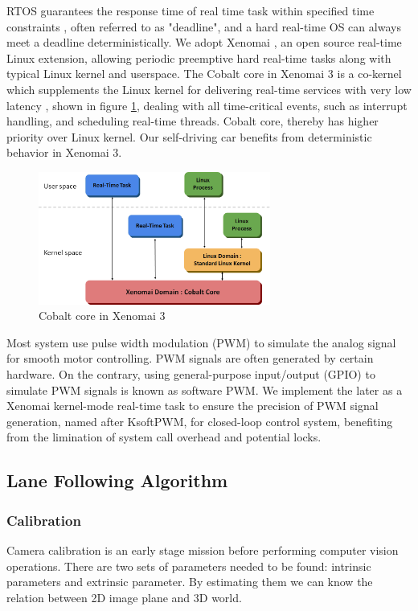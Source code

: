 \documentclass[conference]{IEEEtran}
\begin{document}
RTOS guarantees the response time of real time task within specified time constraints \cite{RTOS}, often referred to as "deadline", and a hard real-time OS can always meet a deadline deterministically. We adopt Xenomai \cite{Xenomai}, an open source real-time Linux extension, allowing periodic preemptive hard real-time tasks along with typical Linux kernel and userspace. The Cobalt core in Xenomai 3 is a co-kernel which supplements the Linux kernel for delivering real-time services with very low latency \cite{rtlws2015}, shown in figure \ref{fig:xeno_arch}, dealing with all time-critical events, such as interrupt handling, and scheduling real-time threads. Cobalt core, thereby has higher priority over Linux kernel. Our self-driving car benefits from deterministic behavior in Xenomai 3.

\begin{figure}
	\centering
	\includegraphics[width=3in]{img/xeno_arch.png}
	\caption{Cobalt core in Xenomai 3}
	\label{fig:xeno_arch}
\end{figure}

Most system use pulse width modulation (PWM) to simulate the analog signal for smooth motor controlling. PWM signals are often generated by certain hardware. On the contrary, using general-purpose input/output (GPIO) to simulate PWM signals is known as software PWM. We implement the later as a Xenomai kernel-mode real-time task to ensure the precision of PWM signal generation, named after KsoftPWM, for closed-loop control system, benefiting from the limination of system call overhead and potential locks.

\subsection{Lane Following Algorithm}

\subsubsection{Calibration}

Camera calibration is an early stage mission before performing computer vision operations. There are two sets of parameters needed to be found: intrinsic parameters and extrinsic parameter. By estimating them we can know the relation between 2D image plane and 3D world.
\end{document}
